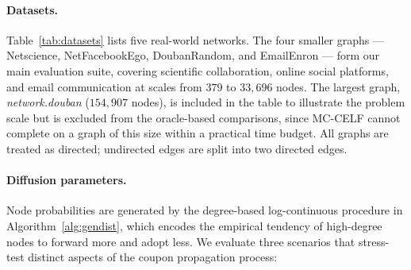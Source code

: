 \documentclass[sigconf]{acmart}
\begin{document}
\paragraph{Datasets.}
Table~\ref{tab:datasets} lists five real-world networks. The four smaller graphs --- Netscience, NetFacebookEgo, DoubanRandom, and EmailEnron --- form our main evaluation suite, covering scientific collaboration, online social platforms, and email communication at scales from $379$ to $33{,}696$ nodes. The largest graph, \emph{network.douban} ($154{,}907$ nodes), is included in the table to illustrate the problem scale but is excluded from the oracle-based comparisons, since MC-CELF cannot complete on a graph of this size within a practical time budget. All graphs are treated as directed; undirected edges are split into two directed edges.

\begin{table}[t]
  \caption{Characteristics of the real-world datasets.}
  \label{tab:datasets}
  \centering
\end{table}

\paragraph{Diffusion parameters.}
Node probabilities are generated by the degree-based log-continuous procedure in Algorithm~\ref{alg:gendist}, which encodes the empirical tendency of high-degree nodes to forward more and adopt less. We evaluate three scenarios that stress-test distinct aspects of the coupon propagation process:
\end{document}
